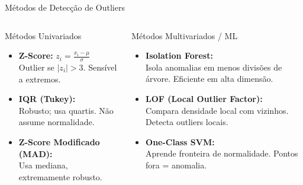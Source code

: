 \documentclass[aspectratio=169]{beamer}
\begin{document}
\begin{frame}{Métodos de Detecção de Outliers}
    \begin{columns}[T]
        \begin{block}{Métodos Univariados}
            \begin{itemize}
                \item \textbf{Z-Score:} $z_i = \frac{x_i - \mu}{\sigma}$\\
                \footnotesize Outlier se $|z_i| > 3$. Sensível a extremos.
                \vspace{0.3em}
                \item \textbf{IQR (Tukey):}\\
                \footnotesize Robusto; usa quartis. Não assume normalidade.
                \vspace{0.3em}
                \item \textbf{Z-Score Modificado (MAD):}\\
                \footnotesize Usa mediana, extremamente robusto.
            \end{itemize}
        \end{block}

        \begin{block}{Métodos Multivariados / ML}
            \begin{itemize}
                \item \textbf{Isolation Forest:}\\
                \footnotesize Isola anomalias em menos divisões de árvore. Eficiente em alta dimensão.
                \vspace{0.3em}
                \item \textbf{LOF (Local Outlier Factor):}\\
                \footnotesize Compara densidade local com vizinhos. Detecta outliers locais.
                \vspace{0.3em}
                \item \textbf{One-Class SVM:}\\
                \footnotesize Aprende fronteira de normalidade. Pontos fora = anomalia.
            \end{itemize}
        \end{block}
    \end{columns}
\end{frame}
\end{document}
